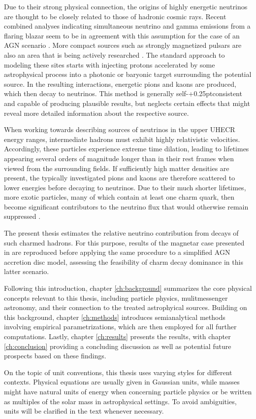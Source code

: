 Due to their strong physical connection, the origins of highly energetic neutrinos are thought to be closely related
to those of hadronic cosmic rays. Recent combined analyses indicating simultaneous neutrino and gamma emissions from a
flaring blazar seem to be in agreement with this assumption for the case of an AGN scenario \cite{ic_blazar_flare, ic_blazar_signal}.
More compact sources such as strongly magnetized pulsars are also an area that is being actively researched \cite{Murase_2009}.
The standard approach to modeling these sites starts with injecting protons accelerated by some astrophysical process into
a photonic or baryonic target surrounding the potential source. In the resulting interactions, energetic pions and kaons are
produced, which then decay to neutrinos. This method is generally self-{\kern+0.25pt}consistent and capable of producing
plausible results, but neglects certain effects that might reveal more detailed information about the respective source.

When working towards describing sources of neutrinos in the upper UHECR energy ranges, intermediate hadrons must exhibit
highly relativistic velocities. Accordingly, these particles experience extreme time dilation, leading to lifetimes
appearing several orders of magnitude longer than in their rest frames when viewed from the surrounding fields.
If sufficiently high matter densities are present, the typically investigated pions and kaons are therefore scattered
to lower energies before decaying to neutrinos. Due to their much shorter lifetimes, more exotic particles, many of which
contain at least one charm quark, then become significant contributors to the neutrino flux that would otherwise remain
suppressed \cite{Tjus_2023}.

The present thesis estimates the relative neutrino contribution from decays of such charmed hadrons. For this purpose, results
of the magnetar case presented in \cite{Carpio_2020} are reproduced before applying the same procedure to a simplified AGN
accretion disc model, assessing the feasibility of charm decay dominance in this latter scenario.

Following this introduction, chapter \ref{ch:background} summarizes the core physical concepts relevant to this thesis,
including particle physics, mulitmessenger astronomy, and their connection to the treated astrophyical sources. Building
on this background, chapter \ref{ch:methods} introduces semianalytical methods involving empirical parametrizations,
which are then employed for all further computations. Lastly, chapter \ref{ch:results} presents the results, with chapter
\ref{ch:conclusion} providing a concluding discussion as well as potential future prospects based on these findings.

On the topic of unit conventions, this thesis uses varying styles for different contexts. Physical equations are usually given
in Gaussian units, while masses might have natural units of energy when concerning particle physics or be written as multiples
of the solar mass in astrophysical settings. To avoid ambiguities, units will be clarified in the text whenever necessary.
